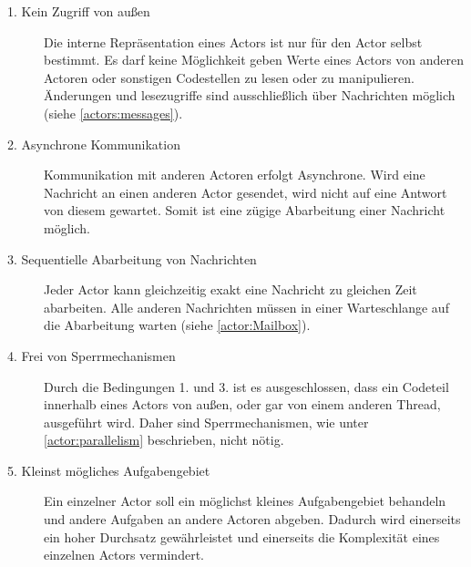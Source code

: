 \begin{description}
    \item[1. Kein Zugriff von außen]\label{actor:requirements:shareNothing}
    Die interne Repräsentation eines Actors ist nur für den Actor selbst bestimmt. Es darf keine Möglichkeit geben Werte eines Actors von anderen Actoren oder sonstigen Codestellen zu lesen oder zu manipulieren. Änderungen und lesezugriffe sind ausschließlich über Nachrichten möglich (siehe \ref{actors:messages}). 
    \item[2. Asynchrone Kommunikation]\label{actor:requirements:AsynchronCommunication}
    Kommunikation mit anderen Actoren erfolgt Asynchrone. Wird eine Nachricht an einen anderen Actor gesendet, wird nicht auf eine Antwort von diesem gewartet. Somit ist eine zügige Abarbeitung einer Nachricht möglich.
    \item[3. Sequentielle Abarbeitung von Nachrichten]
    Jeder Actor kann gleichzeitig exakt eine Nachricht zu gleichen Zeit abarbeiten. Alle anderen Nachrichten müssen in einer Warteschlange auf die Abarbeitung warten (siehe \ref{actor:Mailbox}).
    \item[4. Frei von Sperrmechanismen]
    Durch die Bedingungen {1.} und  {3.} ist es ausgeschlossen, dass ein Codeteil innerhalb eines Actors von außen, oder gar von einem anderen Thread, ausgeführt wird. Daher sind Sperrmechanismen, wie unter \ref{actor:parallelism} beschrieben, nicht nötig.
    \item[5. Kleinst mögliches Aufgabengebiet]
    Ein einzelner Actor soll ein möglichst kleines Aufgabengebiet behandeln und andere Aufgaben an andere Actoren abgeben. Dadurch wird einerseits ein hoher Durchsatz gewährleistet und einerseits die Komplexität eines einzelnen Actors vermindert.
\end{description}

